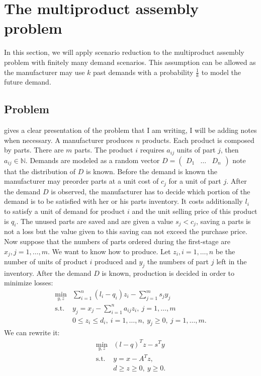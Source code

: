 \documentclass{amsart}
\begin{document}
\section{The multiproduct assembly problem}
In this section, we will apply scenario reduction to the multiproduct assembly problem with finitely many demand scenarios. This assumption can be allowed as the manufacturer may use $k$ past demands with a probability $\frac{1}{k}$ to model the future demand.
\subsection{Problem}
\cite[Chapter 1.3]{shapiro_lectures_2009} gives a clear presentation of the problem that I am writing, I will be adding notes when necessary. A manufacturer produces $n$ products. Each product is composed by parts. There are $m$ parts. The product $i$ requires $a_{ij}$ units of part $j$, then $a_{ij}\in\mathbb{N}$. Demands are modeled as a random vector $D=\begin{pmatrix} D_1 & \hdots & D_n \end{pmatrix}$ note that the distribution of $D$ is known. Before the demand is known the manufacturer may preorder parts at a unit cost of $c_j$ for a unit of part $j$. After the demand $D$ is observed, the manufacturer has to decide which portion of the demand is to be satisfied with her or his parts inventory. It costs additionally $l_i$ to satisfy a unit of demand for product $i$ and the unit selling price of this product is $q_i$. The unused parts are saved and are given a value $s_j < c_j$, saving a parts is not a loss but the value given to this saving can not exceed the purchase price. Now suppose that the numbers of parts ordered during the first-stage are $x_j, j=1,\hdots,m$. We want to know how to produce. Let $z_i,i=1,\hdots,n$ be the number of units of product $i$ produced and $y_j$ the numbers of part $j$ left in the inventory. After the demand $D$ is known, production is decided in order to minimize losses:
\begin{align*}
    \min_{y,z} &\sum_{i=1}^n\left(l_i-q_i\right)z_i-\sum_{j=1}^ms_jy_j \\
     \text{s.t. } &y_j=x_j-\sum_{i=1}^na_{ij}z_i, \: j=1,\hdots,m \\
     & 0 \leq z_i\leq d_i, \: i=1,\hdots,n, \: y_j\geq0, \: j=1,\hdots,m.
\end{align*}
We can rewrite it:
\begin{align*}
    \min_{y,z} & \left(l-q\right)^Tz-s^Ty \\
     \text{s.t. } &y=x-A^Tz, \\
     & d \geq z\geq 0, \:y\geq0.
\end{align*}
\end{document}
